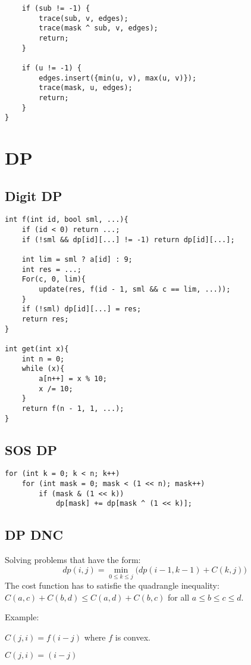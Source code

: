 \documentclass[11pt,a4paper]{article}
\begin{document}
\begin{multicols*}{2}
\begin{lstlisting}
    if (sub != -1) {
        trace(sub, v, edges);
        trace(mask ^ sub, v, edges);
        return;
    }

    if (u != -1) {
        edges.insert({min(u, v), max(u, v)});
        trace(mask, u, edges);
        return;
    }
}

\end{lstlisting}

\section {DP}
\subsection{Digit DP}
\begin{lstlisting}
int f(int id, bool sml, ...){
    if (id < 0) return ...;
    if (!sml && dp[id][...] != -1) return dp[id][...];

    int lim = sml ? a[id] : 9;
    int res = ...;
    For(c, 0, lim){
        update(res, f(id - 1, sml && c == lim, ...));
    }
    if (!sml) dp[id][...] = res;
    return res;
}

int get(int x){
    int n = 0;
    while (x){
        a[n++] = x % 10;
        x /= 10;
    }
    return f(n - 1, 1, ...);
}
\end{lstlisting}

\subsection{SOS DP}
\begin{lstlisting}
for (int k = 0; k < n; k++)
    for (int mask = 0; mask < (1 << n); mask++)
        if (mask & (1 << k)) 
            dp[mask] += dp[mask ^ (1 << k)];
\end{lstlisting}

\subsection{DP DNC}

Solving problems that have the form:
\[
dp(i, j) =
\min\limits_{0 \le k \le j} \Big( dp(i - 1, k - 1) + C(k, j) \Big)
\]
The cost function has to satisfie the quadrangle inequality:
$C(a, c) + C(b, d) \leq C(a, d) + C(b, c)$ for all $a \leq b \leq c \leq d$.

Example:

$C(j, i) = f(i - j)$ where $f$ is convex.

$C(j, i) = (i - j)$


\end{multicols*}
\end{document}
